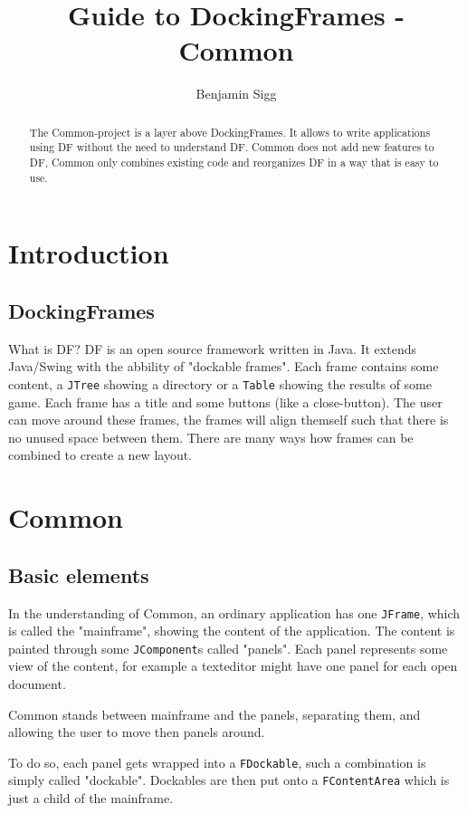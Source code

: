 \documentclass[a4paper,10pt]{article}
\title{Guide to DockingFrames - Common}
\author{Benjamin Sigg}
\newcommand{\src}[1]{\lstinline[basicstyle=\ttfamily]|#1|}
\begin{document}
\maketitle

\begin{abstract}
The Common-project is a layer above DockingFrames. It allows to write applications using DF without the need to understand DF. Common does not add new features to DF, Common only combines existing code and reorganizes DF in a way that is easy to use.
\end{abstract}

\section{Introduction}
\subsection{DockingFrames}
What is DF? DF is an open source framework written in Java. It extends Java/Swing with the abbility of "dockable frames". Each frame contains some content, a \src{JTree} showing a directory or a \src{Table} showing the results of some game. Each frame has a title and some buttons (like a close-button). The user can move around these frames, the frames will align themself such that there is no unused space between them. There are many ways how frames can be combined to create a new layout.

\section{Common}
\subsection{Basic elements}
In the understanding of Common, an ordinary application has one \src{JFrame}, which is called the "mainframe", showing the content of the application. The content is painted through some \src{JComponent}s called "panels". Each panel represents some view of the content, for example a texteditor might have one panel for each open document.

Common stands between mainframe and the panels, separating them, and allowing the user to move then panels around.

To do so, each panel gets wrapped into a \src{FDockable}, such a combination is simply called "dockable". Dockables are then put onto a \src{FContentArea} which is just a child of the mainframe.
\end{document}
